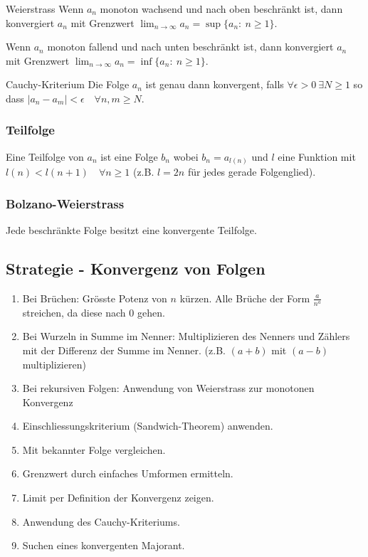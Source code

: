 \documentclass[a4paper,10pt]{article}
\def\limn{\lim_{n\to \infty}}
\begin{document}
\begin{mainbox}{Weierstrass}
Wenn $a_n$ monoton wachsend und nach oben beschränkt ist, dann konvergiert $a_n$ mit Grenzwert $\limn a_n = \sup \{a_n : \ n \ge 1\}$.

Wenn $a_n$ monoton fallend und nach unten beschränkt ist, dann konvergiert $a_n$ mit Grenzwert $\limn a_n = \inf \{a_n : \ n \ge 1\}$.
\end{mainbox}

\begin{mainbox}{Cauchy-Kriterium}
Die Folge $a_n$ ist genau dann konvergent, falls $\forall \epsilon > 0 \ \exists N \ge 1$ so dass $| a_n - a_m | < \epsilon \quad \forall n,m \ge N$.
\end{mainbox}

\subsubsection{Teilfolge}
Eine Teilfolge von $a_n$ ist eine Folge $b_n$ wobei $b_n = a_{l(n)}$ und $l$ eine Funktion mit $l(n) < l(n+1) \quad \forall n \ge 1$ (z.B. $l = 2n$ für jedes gerade Folgenglied). 

\subsubsection{Bolzano-Weierstrass}
Jede beschränkte Folge besitzt eine konvergente Teilfolge.

\subsection{Strategie - Konvergenz von Folgen}
\begin{enumerate}
 \item Bei Brüchen: Grösste Potenz von $n$ kürzen. Alle Brüche der Form $\frac{a}{n^a}$ streichen, da diese nach 0 gehen.
 \item Bei Wurzeln in Summe im Nenner: Multiplizieren des Nenners und Zählers mit der Differenz der Summe im Nenner. (z.B. $(a+b)$ mit $(a-b)$ multiplizieren)
 \item Bei rekursiven Folgen: Anwendung von Weierstrass zur monotonen Konvergenz
 \item Einschliessungskriterium (Sandwich-Theorem) anwenden.
 \item Mit bekannter Folge vergleichen.
 \item Grenzwert durch einfaches Umformen ermitteln.
 \item Limit per Definition der Konvergenz zeigen.
 \item Anwendung des Cauchy-Kriteriums.
 \item Suchen eines konvergenten Majorant.
\end{enumerate}
\end{document}
